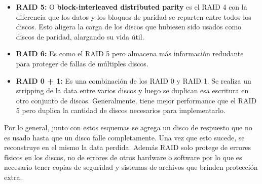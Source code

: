 \begin{itemize}
	\item \textbf{RAID 5:} O \textbf{block-interleaved distributed parity} es el RAID 4 con la diferencia que los datos y los bloques de paridad se reparten entre todos los discos. Esto aligera la carga de los discos que hubiesen sido usados como discos de paridad, alargando su vida útil.
	
	\item \textbf{RAID 6:} Es como el RAID 5 pero almacena más información redudante para proteger de fallas de múltiples discos.
	
	\item \textbf{RAID 0 + 1:} Es una combinación de los RAID 0 y RAID 1. Se realiza un stripping de la data entre varios discos y luego se duplican esa escritura en otro conjunto de discos. Generalmente, tiene mejor performance que el RAID 5 pero duplica la cantidad de discos necesarios para implementarlo.
\end{itemize}

Por lo general, junto con estos esquemas se agrega un disco de respuesto que no es usado hasta que un disco falle completamente. Una vez que esto sucede, se reconstruye en el mismo la data perdida. Además RAID solo protege de errores físicos en los discos, no de errores  de otros hardware o software por lo que es necesario tener copias de seguridad y sistemas de archivos que brinden protección extra.

\printbibliography[keyword=discos, title=Bibliografía]

\newpage
\section{}
\subsection{}
\subsection{}
\subsection{}
\subsection{}
